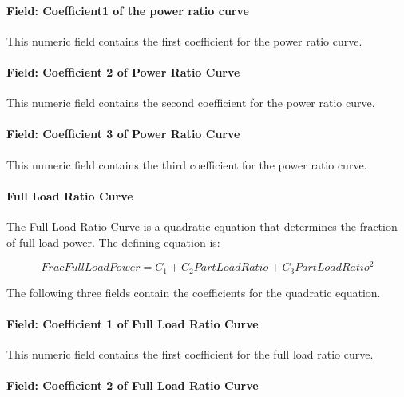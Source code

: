 \paragraph{Field: Coefficient1 of the power ratio curve}\label{field-coefficient1-of-the-power-ratio-curve}

This numeric field contains the first coefficient for the power ratio curve.

\paragraph{Field: Coefficient 2 of Power Ratio Curve}\label{field-coefficient-2-of-power-ratio-curve}

This numeric field contains the second coefficient for the power ratio curve.

\paragraph{Field: Coefficient 3 of Power Ratio Curve}\label{field-coefficient-3-of-power-ratio-curve}

This numeric field contains the third coefficient for the power ratio curve.

\paragraph{Full Load Ratio Curve}\label{full-load-ratio-curve}

The Full Load Ratio Curve is a quadratic equation that determines the fraction of full load power. The defining equation is:

\begin{equation}
    FracFullLoadPower = {C_1} + {C_2}PartLoadRatio + {C_3}PartLoadRati{o^2}
\end{equation}

The following three fields contain the coefficients for the quadratic equation.

\paragraph{Field: Coefficient 1 of Full Load Ratio Curve}\label{field-coefficient-1-of-full-load-ratio-curve}

This numeric field contains the first coefficient for the full load ratio curve.

\paragraph{Field: Coefficient 2 of Full Load Ratio Curve}\label{field-coefficient-2-of-full-load-ratio-curve}

